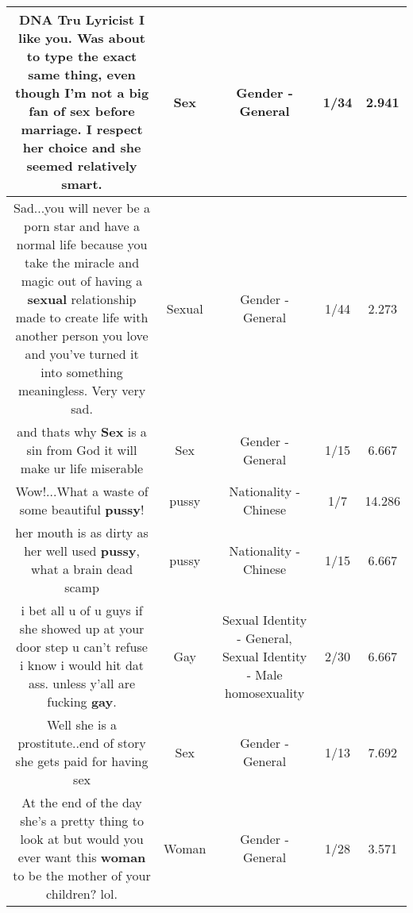 \documentclass[11pt]{article}
\newlength\mylength
\begin{document}
\begin{center}
\begin{longtable}{|C{.65\mylength}|C{.30\mylength}|C{.12\mylength}|C{.12\mylength}|C{.12\mylength}|}
  \small DNA Tru Lyricist I like you.  Was about to type the exact same thing, even though I'm not a big fan of \textbf{sex} before marriage.  I respect her choice and she seemed relatively smart.\normalsize   & Sex & Gender - General & 1/34 & 2.941 \\  \hline
  \small Sad...you will never be a porn star and have a normal life because you take the miracle and magic out of having a \textbf{sexual} relationship made to create life with another person you love and you've turned it into something meaningless. Very very sad.\normalsize   & Sexual & Gender - General & 1/44 & 2.273 \\  \hline
  \small and thats why \textbf{Sex} is a sin from God it will make ur life miserable\normalsize   & Sex & Gender - General & 1/15 & 6.667 \\  \hline
  \small Wow!...What a waste of some beautiful \textbf{pussy}!\normalsize   & pussy & Nationality - Chinese & 1/7 & 14.286 \\  \hline
  \small her mouth is as dirty as her well used \textbf{pussy}, what a brain dead scamp\normalsize   & pussy & Nationality - Chinese & 1/15 & 6.667 \\  \hline
  \small i bet all u of u guys if she showed up at your door step u can't refuse i know i would hit dat ass. unless y'all are fucking \textbf{g\textbf{ay}}.\normalsize   & Gay & Sexual Identity - General, Sexual Identity - Male homosexuality & 2/30 & 6.667 \\  \hline
  \small Well she is a prostitute..end of story she gets paid for having sex\normalsize   & Sex & Gender - General & 1/13 & 7.692 \\  \hline
  \small At the end of the day she's a pretty thing to look at but would you ever want this \textbf{woman} to be the mother of your children? lol.\normalsize   & Woman & Gender - General & 1/28 & 3.571 \\  \hline

\end{longtable}
\end{center}
\end{document}
